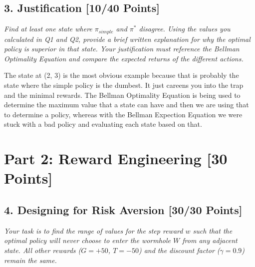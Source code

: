 \documentclass{article}
\begin{document}
\subsection*{3. Justification [10/40 Points]}

\textit{Find at least one state where $\pi_{simple}$ and $\pi^*$ disagree. Using the values you calculated in Q1 and Q2, provide a brief written explanation for why the optimal policy is superior in that state. Your justification must reference the Bellman Optimality Equation and compare the expected returns of the different actions.}

The state at (2, 3) is the most obvious example because that is probably the state where the simple policy is the dumbest.
It just careens you into the trap and the minimal rewards.
The Bellman Optimality Equation is being used to determine the maximum value that a state can have and then we are using that to determine a policy, whereas with the Bellman Expection Equation we were stuck with a bad policy and evaluating each state based on that.

\section*{Part 2: Reward Engineering [30 Points]}

\subsection*{4. Designing for Risk Aversion [30/30 Points]}

\textit{Your task is to find the range of values for the step reward $w$ such that the optimal policy will never choose to enter the wormhole $W$ from any adjacent state. All other rewards ($G=+50$, $T=-50$) and the discount factor ($\gamma=0.9$) remain the same.}
\end{document}
